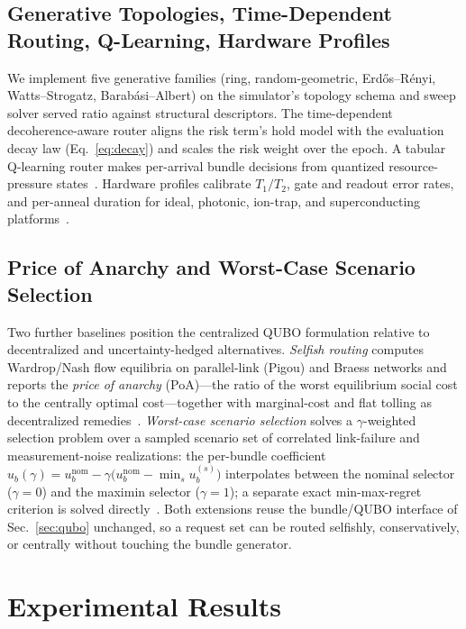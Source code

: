 \documentclass[twocolumn]{article}
\begin{document}
\subsection{Generative Topologies, Time-Dependent Routing,
Q-Learning, Hardware Profiles}
\label{sec:extras}

We implement five generative families (ring, random-geometric,
Erd\H{o}s--R\'enyi, Watts--Strogatz, Barab\'asi--Albert) on the
simulator's topology schema and sweep solver served ratio against
structural descriptors.  The time-dependent decoherence-aware router
aligns the risk term's hold model with the evaluation decay law
(Eq.~\eqref{eq:decay}) and scales the risk weight over the epoch.  A
tabular Q-learning router makes per-arrival bundle decisions from
quantized resource-pressure states~\cite{li2025qlearning,
boyan1993packet}.  Hardware profiles calibrate $T_1/T_2$, gate and
readout error rates, and per-anneal duration for ideal, photonic,
ion-trap, and superconducting platforms~\cite{lvovsky2009optical}.

\subsection{Price of Anarchy and Worst-Case Scenario Selection}
\label{sec:game-theoretic}

Two further baselines position the centralized QUBO formulation
relative to decentralized and uncertainty-hedged alternatives.
\emph{Selfish routing} computes Wardrop/Nash flow equilibria on
parallel-link (Pigou) and Braess networks and reports the \emph{price
of anarchy} (PoA)---the ratio of the worst equilibrium social cost to
the centrally optimal cost---together with marginal-cost and flat
tolling as decentralized remedies~\cite{koutsoupias1999worst,
roughgarden2002bad,braess1968paradoxon}.  \emph{Worst-case scenario
selection} solves a $\gamma$-weighted selection problem over a sampled
scenario set of correlated link-failure and measurement-noise
realizations: the per-bundle coefficient
$u_b(\gamma) = u_b^{\text{nom}} - \gamma\bigl(u_b^{\text{nom}} -
\min_s u_b^{(s)}\bigr)$
interpolates between the nominal selector ($\gamma{=}0$) and the
maximin selector ($\gamma{=}1$); a separate exact min-max-regret
criterion is solved directly~\cite{bertsimas2004price,
ben-tal2009robust}.  Both extensions reuse the bundle/QUBO interface
of Sec.~\ref{sec:qubo} unchanged, so a request set can be routed
selfishly, conservatively, or centrally without touching the bundle
generator.

\section{Experimental Results}
\label{sec:results}
\end{document}
